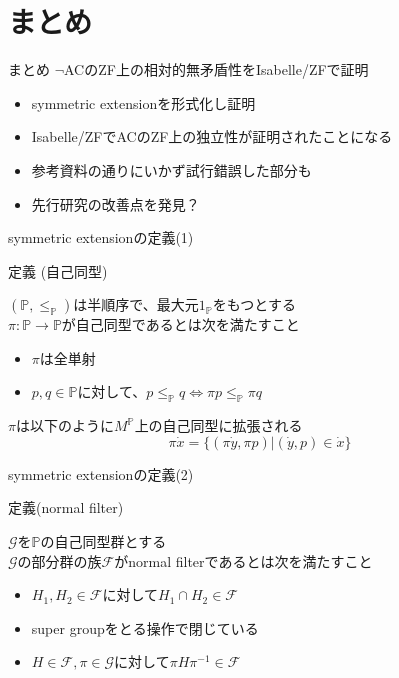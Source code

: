 \documentclass[17pt,aspectratio=169]{beamer}
\newcommand{\Pbb}{\mathbb{P}}
\newcommand{\Gcal}{\mathcal{G}}
\newcommand{\Fcal}{\mathcal{F}}
\begin{document}
\section {まとめ}

\begin{frame}{まとめ}
    $\neg$ACのZF上の相対的無矛盾性をIsabelle/ZFで証明
    {\small
    \begin{itemize}[itemsep=8pt]
        \item symmetric extensionを形式化し証明
        \item Isabelle/ZFでACのZF上の独立性が証明されたことになる
        \item 参考資料の通りにいかず試行錯誤した部分も
        \item 先行研究の改善点を発見？
    \end{itemize}
    }
\end{frame}

\appendix
{}

\begin{frame}{symmetric extensionの定義(1)}
    \begin{itembox}[l]{定義 (自己同型)}
        {\small
            $(\Pbb, \le_{\Pbb})$は半順序で、最大元$1_{\Pbb}$をもつとする \\
            $\pi : \Pbb \rightarrow \Pbb$が自己同型であるとは次を満たすこと
            \begin{itemize}
                \setlength{\itemsep}{3pt}
                \item $\pi$は全単射
                \item $p, q \in \Pbb$に対して、$p \le_{\Pbb} q \Leftrightarrow \pi p \le_{\Pbb} \pi q$
            \end{itemize}
            $\pi$は以下のように$M^\Pbb$上の自己同型に拡張される
            $$ \pi \dot{x} = \{ (\pi \dot{y}, \pi p) | (\dot{y}, p) \in \dot{x} \} $$
        }
    \end{itembox}
\end{frame}


\begin{frame}{symmetric extensionの定義(2)}
    \begin{itembox}[l]{定義(normal filter)}
        {\small
            $\Gcal$を$\Pbb$の自己同型群とする \\
            $\Gcal$の部分群の族$\Fcal$がnormal filterであるとは次を満たすこと
            \begin{itemize}
                \setlength{\itemsep}{3pt}
                \item $H_1, H_2 \in \Fcal$に対して$H_1 \cap H_2 \in \Fcal$
                \item super groupをとる操作で閉じている
                \item $H \in \Fcal, \pi \in \Gcal$に対して$\pi H \pi^{-1} \in \Fcal$
            \end{itemize} }
    \end{itembox}
\end{frame}
\end{document}
